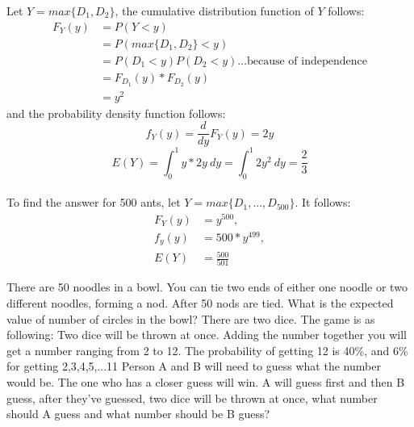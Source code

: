 \documentclass[answers]{exam}
\begin{document}
\begin{questions}
\begin{solution}
Let $Y = max\{D_1, D_2\}$, the cumulative distribution function of $Y$ follows:
\begin{align*}
    F_Y(y) &= P(Y<y)\\
    &= P(max\{D_1, D_2\}<y)\\
    &= P(D_1<y)P(D_2<y) \dots \text{because of independence}\\
    &= F_{D_1}(y)*F_{D_2}(y)\\
    &= y^2
\end{align*}
and the probability density function follows:
$$f_Y(y) = \frac{d}{dy}F_Y(y) = 2y$$
$$E(Y) = \int_{0}^{1} y * 2y\ dy = \int_{0}^{1}2y^2\ dy = \frac{2}{3}$$
\\
To find the answer for 500 ants, let $Y = max\{D_1,..., D_{500}\}$. It follows:
\begin{align*}
    F_Y(y) &= y^{500},\\
    f_y(y) &= 500*y^{499},\\
    E(Y) &= \frac{500}{501}
\end{align*}

\end{solution}

\question
There are 50 noodles in a bowl. 
You can tie two ends of either one noodle or two different noodles, forming a nod.
After 50 nods are tied. What is the expected value of number of circles in the bowl?
\question
There are two dice. The game is as following: 
Two dice will be thrown at once. 
Adding the number together you will get a number ranging from 2 to 12.
The probability of getting 12 is 40\%, and 6\% for getting 2,3,4,5,...11
Person A and B will need to guess what the number would be. 
The one who has a closer guess will win.
A will guess first and then B guess, after they've guessed, 
two dice will be thrown at once, 
what number should A guess and what number should be B guess?
\end{questions}
\end{document}

